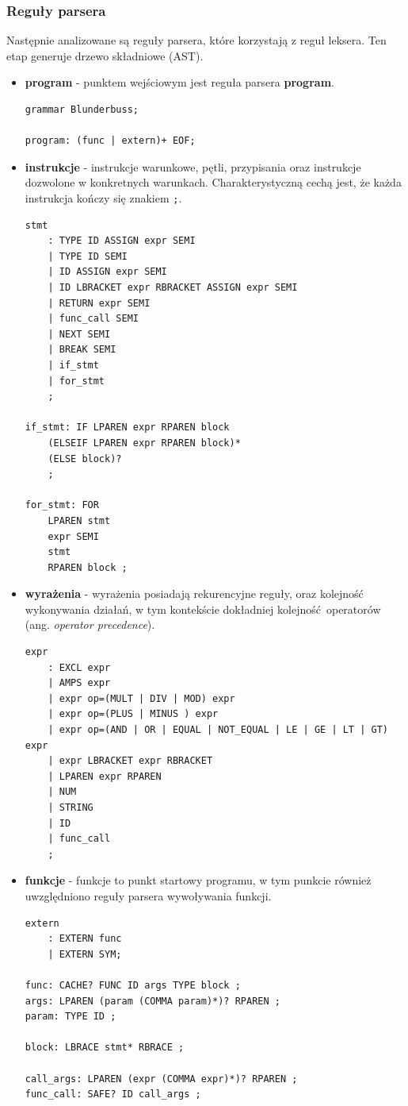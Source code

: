 \subsubsection{Reguły parsera}

Następnie analizowane są reguły parsera, które korzystają z reguł leksera. Ten etap generuje drzewo składniowe (AST).

\begin{itemize}
    \item \textbf{program} - punktem wejściowym jest reguła parsera \textbf{program}.
        \begin{lstlisting}[caption={Punkt wejściowy parsera}]
grammar Blunderbuss;

program: (func | extern)+ EOF;
        \end{lstlisting}
    \item \textbf{instrukcje} - instrukcje warunkowe, pętli, przypisania oraz instrukcje dozwolone w konkretnych warunkach. Charakterystyczną cechą jest, że każda instrukcja kończy się znakiem \verb|;|.
        \begin{lstlisting}[caption={Instrukcje}, label={lst:reguly-parsera}]
stmt
    : TYPE ID ASSIGN expr SEMI
    | TYPE ID SEMI
    | ID ASSIGN expr SEMI
    | ID LBRACKET expr RBRACKET ASSIGN expr SEMI
    | RETURN expr SEMI
    | func_call SEMI
    | NEXT SEMI
    | BREAK SEMI
    | if_stmt
    | for_stmt
    ;

if_stmt: IF LPAREN expr RPAREN block
    (ELSEIF LPAREN expr RPAREN block)*
    (ELSE block)?
    ;

for_stmt: FOR
    LPAREN stmt
    expr SEMI
    stmt
    RPAREN block ;
        \end{lstlisting}
    \item \textbf{wyrażenia} - wyrażenia posiadają rekurencyjne reguły, oraz kolejność wykonywania działań, w tym kontekście dokładniej kolejność operatorów (ang. \textit{operator precedence}).
        \begin{lstlisting}[caption={Wyrażenia}]
expr
    : EXCL expr
    | AMPS expr
    | expr op=(MULT | DIV | MOD) expr
    | expr op=(PLUS | MINUS ) expr
    | expr op=(AND | OR | EQUAL | NOT_EQUAL | LE | GE | LT | GT) expr
    | expr LBRACKET expr RBRACKET
    | LPAREN expr RPAREN
    | NUM
    | STRING
    | ID
    | func_call
    ;
        \end{lstlisting}
    \item \textbf{funkcje} - funkcje to punkt startowy programu, w tym punkcie również uwzględniono reguły parsera wywoływania funkcji.
        \begin{lstlisting}[caption={Funkcje}]
extern
    : EXTERN func
    | EXTERN SYM;

func: CACHE? FUNC ID args TYPE block ;
args: LPAREN (param (COMMA param)*)? RPAREN ;
param: TYPE ID ;

block: LBRACE stmt* RBRACE ;

call_args: LPAREN (expr (COMMA expr)*)? RPAREN ;
func_call: SAFE? ID call_args ;
        \end{lstlisting}
\end{itemize}


